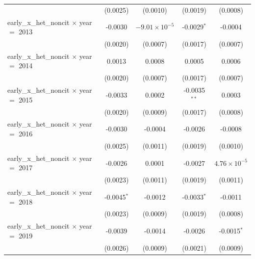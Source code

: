 \begin{tabular}{lcccc}
                                                    & (0.0025)           & (0.0010)                  & (0.0019)             & (0.0008)\\   
   early\_x\_het\_noncit $\times$ year $=$ 2013     & -0.0030            & $-9.01\times 10^{-5}$     & -0.0029$^{*}$        & -0.0004\\   
                                                    & (0.0020)           & (0.0007)                  & (0.0017)             & (0.0007)\\   
   early\_x\_het\_noncit $\times$ year $=$ 2014     & 0.0013             & 0.0008                    & 0.0005               & 0.0006\\   
                                                    & (0.0020)           & (0.0007)                  & (0.0017)             & (0.0007)\\   
   early\_x\_het\_noncit $\times$ year $=$ 2015     & -0.0033            & 0.0002                    & -0.0035$^{**}$       & 0.0003\\   
                                                    & (0.0020)           & (0.0009)                  & (0.0017)             & (0.0008)\\   
   early\_x\_het\_noncit $\times$ year $=$ 2016     & -0.0030            & -0.0004                   & -0.0026              & -0.0008\\   
                                                    & (0.0025)           & (0.0011)                  & (0.0019)             & (0.0010)\\   
   early\_x\_het\_noncit $\times$ year $=$ 2017     & -0.0026            & 0.0001                    & -0.0027              & $4.76\times 10^{-5}$\\    
                                                    & (0.0023)           & (0.0011)                  & (0.0019)             & (0.0011)\\   
   early\_x\_het\_noncit $\times$ year $=$ 2018     & -0.0045$^{*}$      & -0.0012                   & -0.0033$^{*}$        & -0.0011\\   
                                                    & (0.0023)           & (0.0009)                  & (0.0019)             & (0.0008)\\   
   early\_x\_het\_noncit $\times$ year $=$ 2019     & -0.0039            & -0.0014                   & -0.0026              & -0.0015$^{*}$\\   
                                                    & (0.0026)           & (0.0009)                  & (0.0021)             & (0.0009)\\   

\end{tabular}
